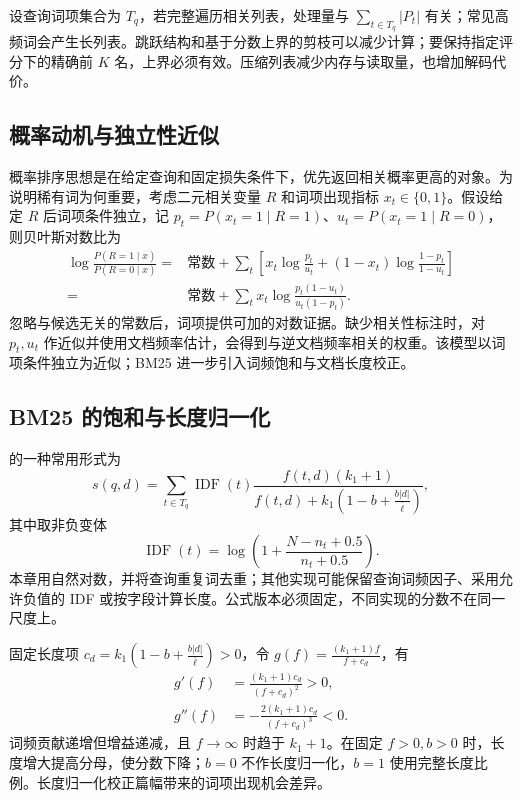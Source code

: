\documentclass[../textbook.tex]{subfiles}
\begin{document}
设查询词项集合为 $T_q$，若完整遍历相关列表，处理量与 $\sum_{t\in T_q}|P_t|$ 有关；常见高频词会产生长列表。跳跃结构和基于分数上界的剪枝可以减少计算；要保持指定评分下的精确前 $K$ 名，上界必须有效。压缩列表减少内存与读取量，也增加解码代价。

\subsection{概率动机与独立性近似}
概率排序思想是在给定查询和固定损失条件下，优先返回相关概率更高的对象。为说明稀有词为何重要，考虑二元相关变量 $R$ 和词项出现指标 $x_t\in\{0,1\}$。假设给定 $R$ 后词项条件独立，记 $p_t=P(x_t=1\mid R=1)$、$u_t=P(x_t=1\mid R=0)$，则贝叶斯对数比为
\begin{align}
\log\frac{P(R=1\mid x)}{P(R=0\mid x)}
={}&\text{常数}+\sum_t\left[x_t\log\frac{p_t}{u_t}+(1-x_t)\log\frac{1-p_t}{1-u_t}\right]\\
={}&\text{常数}+\sum_tx_t\log\frac{p_t(1-u_t)}{u_t(1-p_t)}.
\end{align}
忽略与候选无关的常数后，词项提供可加的对数证据。缺少相关性标注时，对 $p_t,u_t$ 作近似并使用文档频率估计，会得到与逆文档频率相关的权重。该模型以词项条件独立为近似；BM25 进一步引入词频饱和与文档长度校正\cite{robertson2009bm25}。

\subsection{BM25 的饱和与长度归一化}
的一种常用形式为
\begin{equation}
s(q,d)=\sum_{t\in T_q}\operatorname{IDF}(t)
\frac{f(t,d)(k_1+1)}{f(t,d)+k_1(1-b+\frac{b|d|}{\bar\ell})},
\label{eq:ir-bm25}
\end{equation}
其中取非负变体
\begin{equation}
\operatorname{IDF}(t)=\log\left(1+\frac{N-n_t+0.5}{n_t+0.5}\right).
\end{equation}
本章用自然对数，并将查询重复词去重；其他实现可能保留查询词频因子、采用允许负值的 IDF 或按字段计算长度。公式版本必须固定，不同实现的分数不在同一尺度上。

固定长度项 $c_d=k_1(1-b+\frac{b|d|}{\bar\ell})>0$，令 $g(f)=\frac{(k_1+1)f}{f+c_d}$，有
\begin{equation}
 \begin{aligned}
  g'(f) &= \frac{(k_1+1)c_d}{(f+c_d)^2}>0, \\
  g''(f) &= -\frac{2(k_1+1)c_d}{(f+c_d)^3}<0.
 \end{aligned}
\end{equation}
词频贡献递增但增益递减，且 $f\to\infty$ 时趋于 $k_1+1$。在固定 $f>0,b>0$ 时，长度增大提高分母，使分数下降；$b=0$ 不作长度归一化，$b=1$ 使用完整长度比例。长度归一化校正篇幅带来的词项出现机会差异。
\end{document}
